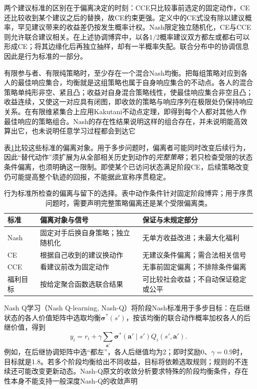 两个建议标准的区别在于偏离决定的时刻：CCE只比较事前选定的固定动作，CE还比较收到某个建议之后的替换，故CE约束更强。定义中的CE式没有除以建议概率，罕见建议带来的收益差仍按发生概率计权。Nash限定独立随机化，CE与CCE则允许联合建议相关。在上述协调博弈中，以各$1/2$概率建议双方都左或都右可以形成CE；将其边缘化后再独立抽样，却有一半概率失配。联合分布中的协调信息因此是行为标准的一部分。

有限参与者、有限纯策略时，至少存在一个混合Nash均衡。把每组策略对应到各人的最佳响应集合，均衡就是这组策略也属于自身响应集合的不动点。各人的混合策略单纯形非空、紧且凸；收益对自身混合策略线性，使最佳响应集合非空且凸；收益连续，又使这一对应具有闭图，即收敛的策略与响应序列在极限处仍保持响应关系。在有限维紧集合上应用Kakutani不动点定理，即得到每个人都对其他人作最佳响应的策略组合。Nash的存在性结果说明这样的组合存在，并未说明能高效算出它，也未说明任意学习过程都会到达它

表\ref{tab:rl-multi-agent-equilibria}比较这些标准的偏离对象。用于多步问题时，偏离者可能同时改变后续行为，因此“替代动作”须扩展为从全部相关历史到动作的\emph{完整策略}；若只检查受限的状态条件偏离，也须明确这一限制。即使某个已访问状态满足阶段CE，后续策略改变仍可能提高整个轨迹的回报，不能据此宣称序贯稳定。

\begin{table}[htbp]
 \centering
 \begin{tabularx}{\linewidth}{@{}l >{\raggedright\arraybackslash}X >{\raggedright\arraybackslash}X@{}}
 \toprule
 标准 & 偏离对象与信号 & 保证与未规定部分\\
 \midrule
 Nash & 固定对手后换自身策略；独立随机化 & 无单方收益改进；未最大化福利\\
 CE & 根据自己收到的建议换动作 & 无建议条件偏离；需合法相关信号\\
 CCE & 看建议前改为固定动作 & 无事前固定偏离；不排除条件偏离\\
 福利目标 & 按给定聚合函数选联合结果 & 可比较社会收益；不自动保证稳定或公平\\
 \bottomrule
 \end{tabularx}
 \caption{行为标准所检查的偏离与留下的选择。表中动作条件针对固定阶段博弈；用于序贯问题时，需要声明完整策略偏离还是某个受限偏离类。}
 \label{tab:rl-multi-agent-equilibria}
\end{table}

Nash Q学习（Nash Q-learning, Nash-Q）将阶段Nash标准用于多步目标：在后继状态的各人价值矩阵中选取均衡$\bm\sigma^*(s')$，按该均衡的联合动作概率加权各人的后继价值，得到
\[
 y_i=r_i+\gamma\sum_{\bm a'}\bm\sigma^*(\bm a'\mid s')
                         Q_i(s',\bm a').
\]
例如，在后继协调矩阵中选“都左”，各人后继值均为2；即时奖励0、$\gamma=0.9$时，目标就是1.8。若多个阶段均衡给出不同收益，目标将依赖选取规则；规则的不连续还可能改变更新动态。Nash-Q原文的收敛分析要求特殊的阶段均衡条件，存在性本身不能支持一般深度Nash-Q的收敛声明

